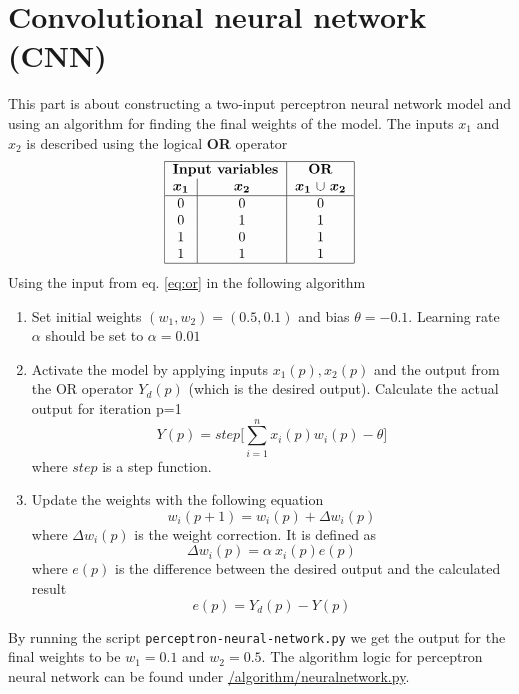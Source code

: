 \documentclass{article}
\begin{document}
    
    \section{Convolutional neural network (CNN)}
    
    
    This part is about constructing a two-input perceptron neural network model and using an algorithm for finding the final weights of the model. The inputs  $x_1$ and $x_2$ is described using the logical \textbf{OR} operator
    \begin{equation}
        \begin{tabular}{ | c | c | c | }
            \hline
            \multicolumn{2}{ |c| }{\textbf{Input variables}} & \textbf{OR} \\ 
            $\boldsymbol{x_1}$ & $\boldsymbol{x_2}$ & $\boldsymbol{x_1}$ $\cup$ $\boldsymbol{x_2}$ \\ \hline
            0 & 0 & 0\\
            0 & 1 & 1\\
            1 & 0 & 1\\
            1 & 1 & 1\\ \hline
        \end{tabular}
        \label{eq:or}
    \end{equation}
    Using the input from eq. \eqref{eq:or} in the following algorithm \\

    \begin{enumerate}
        \item Set initial weights $(w_1, w_2) = (0.5, 0.1)$ and bias $\theta = -0.1$. Learning rate $\alpha$ should be set to $\alpha = 0.01$ 
        \item Activate the model by applying inputs $x_1(p), x_2(p)$ and the output from the OR operator $Y_d(p)$ (which is the desired output). Calculate the actual output for iteration p=1 
        \begin{equation}
            Y(p) = step\Bigg[\sum_{i=1}^n x_i(p)w_i(p) - \theta\Bigg]
        \end{equation}
        where $step$ is a step function.
        \item Update the weights with the following equation
        \begin{equation}
            w_i(p+1) = w_i(p) + \Delta w_i(p)
        \end{equation}
        where $\Delta w_i(p)$ is the weight correction. It is defined as 
        \begin{equation}
            \Delta w_i(p) = \alpha\ x_i(p) e(p)
        \end{equation}
        where $e(p)$ is the difference between the desired output and the calculated result
        \begin{equation}
            e(p) = Y_d(p) - Y(p)
        \end{equation}
    \end{enumerate}
    By running the script \texttt{perceptron-neural-network.py} we get the output for the final weights to be
    $w_1=0.1$ and $w_2 = 0.5$.
    The algorithm logic for perceptron neural network can be found under \url{/algorithm/neuralnetwork.py}.
\end{document}
